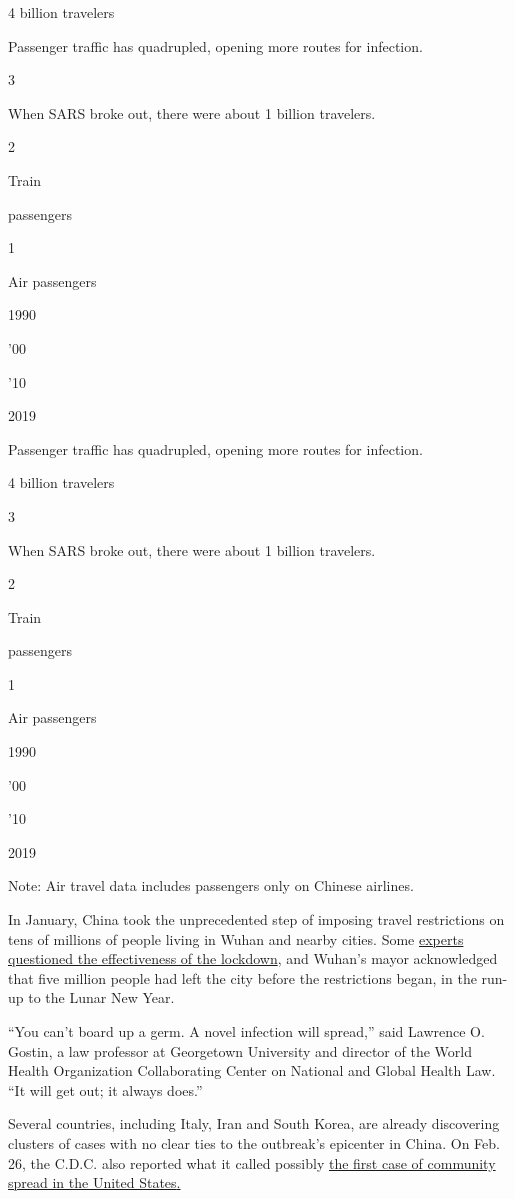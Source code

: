4 billion travelers

Passenger traffic has quadrupled, opening more routes for infection.

3

When SARS broke out, there were about 1 billion travelers.

2

Train

passengers

1

Air passengers

1990

'00

'10

2019

Passenger traffic has quadrupled, opening more routes for infection.

4 billion travelers

3

When SARS broke out, there were about 1 billion travelers.

2

Train

passengers

1

Air passengers

1990

'00

'10

2019

Note: Air travel data includes passengers only on Chinese airlines.

In January, China took the unprecedented step of imposing travel
restrictions on tens of millions of people living in Wuhan and nearby
cities. Some
\href{https://www.nytimes3xbfgragh.onion/2020/01/26/world/asia/coronavirus-wuhan-china-hubei.html}{experts
questioned the effectiveness of the lockdown}, and Wuhan's mayor
acknowledged that five million people had left the city before the
restrictions began, in the run-up to the Lunar New Year.

``You can't board up a germ. A novel infection will spread,'' said
Lawrence O. Gostin, a law professor at Georgetown University and
director of the World Health Organization Collaborating Center on
National and Global Health Law. ``It will get out; it always does.''

Several countries, including Italy, Iran and South Korea, are already
discovering clusters of cases with no clear ties to the outbreak's
epicenter in China. On Feb. 26, the C.D.C. also reported what it called
possibly
\href{https://www.nytimes3xbfgragh.onion/2020/02/26/health/coronavirus-cdc-usa.html}{the
first case of community spread in the United
States}\href{https://www.nytimes3xbfgragh.onion/2020/02/26/health/coronavirus-cdc-usa.html}{.}

